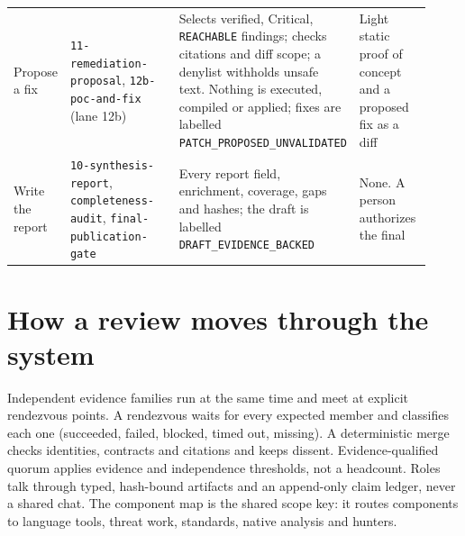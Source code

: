 \documentclass[10pt,a4paper]{article}
\newcommand{\jn}[1]{\texttt{#1}}
\begin{document}
{\begin{longtable}{@{}p{0.13\linewidth}p{0.33\linewidth}p{0.27\linewidth}p{0.19\linewidth}@{}}
Propose a fix & \jn{11-remediation-proposal}, \jn{12b-poc-and-fix} (lane 12b) & Selects verified, Critical, \jn{REACHABLE} findings; checks citations and diff scope; a denylist withholds unsafe text. Nothing is executed, compiled or applied; fixes are labelled \jn{PATCH\_PROPOSED\_UNVALIDATED} & Light static proof of concept and a proposed fix as a diff\\
Write the report & \jn{10-synthesis-report}, \jn{completeness-audit}, \jn{final-publication-gate} & Every report field, enrichment, coverage, gaps and hashes; the draft is labelled \jn{DRAFT\_EVIDENCE\_BACKED} & None. A person authorizes the final\\
\bottomrule
\end{longtable}}

\section{How a review moves through the system}
\begin{center}
\end{center}

Independent evidence families run at the same time and meet at explicit rendezvous points. A
rendezvous waits for every expected member and classifies each one (succeeded, failed, blocked,
timed out, missing). A deterministic merge checks identities, contracts and citations and keeps
dissent. Evidence-qualified quorum applies evidence and independence thresholds, not a headcount.
Roles talk through typed, hash-bound artifacts and an append-only claim ledger, never a shared chat.
The component map is the shared scope key: it routes components to language tools, threat work,
standards, native analysis and hunters.
\end{document}
